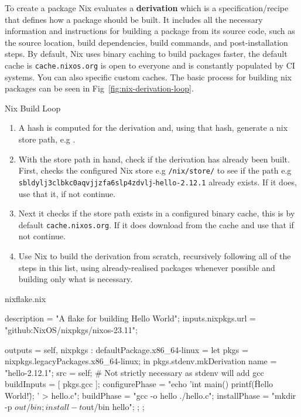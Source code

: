 To create a package Nix evaluates a \textbf{derivation} which is a specification/recipe that defines how a package should be built. It includes all the necessary information and instructions for building a package from its source code, such as the source location, build dependencies, build commands, and post-installation steps. By default, Nix uses binary caching to build packages faster, the default cache is \texttt{cache.nixos.org} is open to everyone and is constantly populated by CI systems. You can also specific custom caches. The basic process for building nix packages can be seen in Fig~\ref{fig:nix-derivation-loop}.

\begin{figureBox}[label = {fig:nix-derivation-loop}]{Nix Build Loop}
  \begin{enumerate}
    \item A hash is computed for the derivation and, using that hash, generate a nix store path, e.g .
    \item  With the store path in hand, check if the derivation has already been built. First, checks the configured Nix store e.g {\color{Purple}\texttt{/nix/store/}} to see if the path e.g {\color{RoyalBlue}\texttt{sbldylj3clbkc0aqvjjzfa6slp4zdvlj}}-{\color{Orange}\texttt{hello-2.12.1}} already exists. If it does, use that it, if not continue.
    \item Next it checks if the store path exists in a configured binary cache, this is by default \texttt{cache.nixos.org}. If it does download from the cache and use that if not continue.
    \item Use Nix to build the derivation from scratch, recursively following all of the steps in this list, using already-realised packages whenever possible and building only what is necessary.
  \end{enumerate}
\end{figureBox}


\begin{codeBox}[label = {fig:nix-flake}]{nix}{flake.nix}
  {
  description = "A flake for building Hello World";
  inputs.nixpkgs.url = "github:NixOS/nixpkgs/nixos-23.11";

  outputs = { self, nixpkgs }: {
  defaultPackage.x86_64-linux =
  let
  pkgs = nixpkgs.legacyPackages.x86_64-linux;
  in
  pkgs.stdenv.mkDerivation {
  name = "hello-2.12.1";
  src = self;
  # Not strictly necessary as stdenv will add gcc
  buildInputs = [ pkgs.gcc ];
  configurePhase = "echo 'int main() { printf(\"Hello World!\"); }' > hello.c";
  buildPhase = "gcc -o hello ./hello.c";
  installPhase = "mkdir -p $out/bin; install -t $out/bin hello";
  };
  };
  }
\end{codeBox}

